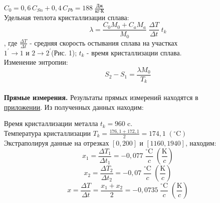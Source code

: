 \documentclass[a4paper]{article}
\begin{document}
 $ C_0 = 0,6\,C_{Sn}+0,4\,C_{Pb} = 188\; \frac{\mbox{Дж}}{\mbox{кг} \cdot \mbox{К}}$\\
 


 Удельная теплота кристаллизации сплава:\hypertarget{formul1}{}
 \begin{equation}
 	\lambda=\frac{C_0M_0+C_aM_a}{M_0}\;\frac{\Delta T}{\Delta t}\; t_k
 \end{equation}
, где $ \frac{\Delta T}{\Delta t} $ - средняя скорость остывания сплава на участках \\
$ 1^{'}\rightarrow1 $ и $ 2\rightarrow2^{'} $(Рис. 1); $ t_k $ - время кристаллизации сплава.\\

  Изменение энтропии:\hypertarget{formul2}{}
\begin{equation}
	S_2-S_1=\frac{\lambda M_0}{T_k}
\end{equation}\\

\textbf{Прямые измерения.}
Результаты прямых измерений находятся в \\ \hyperlink{table}{приложении}. Из полученных данных находим:

Время кристаллизации металла $ t_k= 960$ c.\\

Температура  кристаллизации $ T_k=\frac{176,1+172,1}{2}=174,1\;(^{\circ}\mbox{C}) $\\

Экстраполируя данные на отрезках $ [0,200] $ и $ [1160,1940] $, находим:
$$ x_1 = \frac{\Delta T_1}{\Delta t_1}=-0,077\; \frac{^\circ\mbox{C}}{c}\;\left( \frac{\mbox{K}}{c}\right) $$
$$ x_2 = \frac{\Delta T_2}{\Delta t_2}=-0,07\; \frac{^\circ\mbox{C}}{c}\;\left( \frac{\mbox{K}}{c}\right)$$
$$x=\frac{\Delta T}{\Delta t}=\frac{x_1+x_2}{2}=-0,0735\; \frac{^\circ\mbox{C}}{c}\;\left( \frac{\mbox{K}}{c}\right)$$\\
\end{document}
